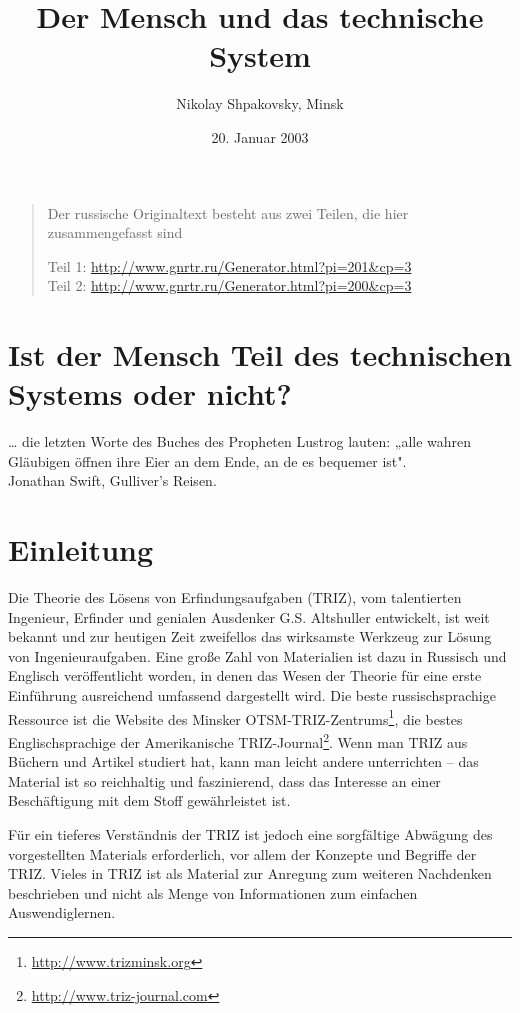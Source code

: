 \documentclass[11pt,a4paper]{article}
\title{Der Mensch und das technische System}
\author{Nikolay Shpakovsky, Minsk}
\date{20. Januar 2003}
\begin{document}
\maketitle

\begin{quote}
  Der russische Originaltext besteht aus zwei Teilen, die hier zusammengefasst
  sind
  
  Teil 1: \url{http://www.gnrtr.ru/Generator.html?pi=201&cp=3}\\
  Teil 2: \url{http://www.gnrtr.ru/Generator.html?pi=200&cp=3}
\end{quote}

\section*{Ist der Mensch Teil des technischen Systems oder nicht?}


\begin{flushright}
 \ldots{} die letzten Worte des Buches des Propheten Lustrog lauten: „alle
 wahren Gläubigen öffnen ihre Eier an dem Ende, an de es bequemer
 ist". \\ Jonathan Swift, Gulliver's Reisen. 
\end{flushright}

\section*{Einleitung}
Die Theorie des Lösens von Erfindungsaufgaben (TRIZ), vom talentierten
Ingenieur, Erfinder und genialen Ausdenker G.S. Altshuller entwickelt, ist
weit bekannt und zur heutigen Zeit zweifellos das wirksamste Werkzeug zur
Lösung von Ingenieuraufgaben. Eine große Zahl von Materialien ist dazu in
Russisch und Englisch veröffentlicht worden, in denen das Wesen der Theorie
für eine erste Einführung ausreichend umfassend dargestellt wird.  Die beste
russischsprachige Ressource ist die Website des Minsker
OTSM-TRIZ-Zentrums\footnote{\url{http://www.trizminsk.org}}, die bestes
Englischsprachige der Amerikanische
TRIZ-Journal\footnote{\url{http://www.triz-journal.com}}. Wenn man TRIZ aus
Büchern und Artikel studiert hat, kann man leicht andere unterrichten -- das
Material ist so reichhaltig und faszinierend, dass das Interesse an einer
Beschäftigung mit dem Stoff gewährleistet ist.

Für ein tieferes Verständnis der TRIZ ist jedoch eine sorgfältige Abwägung des
vorgestellten Materials erforderlich, vor allem der Konzepte und Begriffe der
TRIZ.  Vieles in TRIZ ist als Material zur Anregung zum weiteren Nachdenken
beschrieben und nicht als Menge von Informationen zum einfachen
Auswendiglernen.
\end{document}
